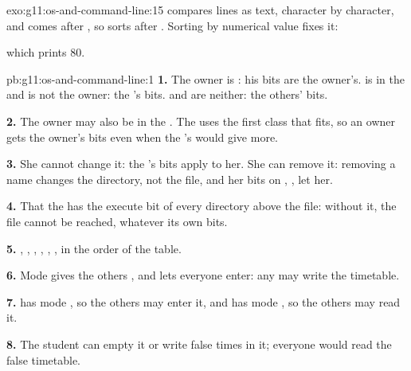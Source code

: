 \begin{solution}{exo:g11:os-and-command-line:15}
 compares lines as text, character by character, and  comes after , so  sorts after
. Sorting by numerical value fixes it:

\smallskip\noindent\hspace*{2em}

\smallskip\noindent which prints $80$.
\end{solution}

\begin{solution}{pb:g11:os-and-command-line:1}
\textbf{1.} The owner is : his bits are the owner's.  is in the   and is not
the owner: the 's bits.  and  are neither: the others' bits.

\textbf{2.} The owner may also be in the . The  uses the first class that fits, so an owner gets the
owner's bits even when the 's would give more.

\textbf{3.} She cannot change it: the 's bits  apply to her. She can remove it: removing a name changes
the directory, not the file, and her bits on , , let her.

\textbf{4.} That the  has the execute bit of every directory above the file: without it, the file cannot be
reached, whatever its own bits.

\textbf{5.} , , , , ,
, in the order of the table.

\textbf{6.} Mode  gives the others , and  lets everyone enter: any  may write
the timetable.

\textbf{7.}  has mode , so the others may enter it, and  has mode
, so the others may read it.

\textbf{8.} The student can empty it or write false times in it; everyone would read the false timetable.


\end{solution}
